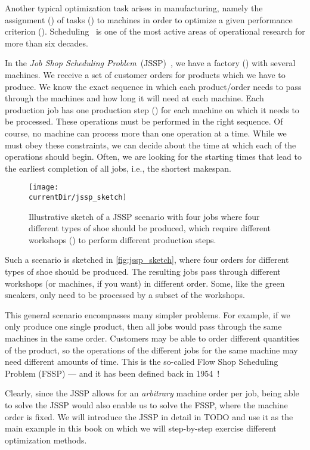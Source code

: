 %
%
\label{sec:jsspExample}%
%
Another typical optimization task arises in manufacturing, namely the assignment () of tasks () to machines in order to optimize a given performance criterion ().
Scheduling~\cite{P2016STAAS,PS2009FYOSASOM} is one of the most active areas of operational research for more than  six decades.

In the \emph{Job Shop Scheduling Problem}~(JSSP)~\cite{CGLL1995STAIA,GLLRK1979OAAIDSASAS,LLRKS1993SASAAC,L1982RRITTOMS,T1993BFBSP,BDP1996TJSSPCANST}, we have a factory () with several machines.
We receive a set of customer orders for products which we have to produce.
We know the exact sequence in which each product/order needs to pass through the machines and how long it will need at each machine.
Each production job has one production step () for each machine on which it needs to be processed.
These operations must be performed in the right sequence.
Of course, no machine can process more than one operation at a time.
While we must obey these constraints, we can decide about the time at which each of the operations should begin.
Often, we are looking for the starting times that lead to the earliest completion of all jobs, i.e., the shortest makespan.

\begin{figure}%
\centering%
\texttt{[image: \\currentDir/jssp\_sketch]}%
\caption{Illustrative sketch of a JSSP scenario with four jobs where four different types of shoe should be produced, which require different workshops () to perform different production steps.}%
\label{fig:jssp_sketch}%
\end{figure}%
%
Such a scenario is sketched in \autoref{fig:jssp_sketch}, where four orders for different types of shoe should be produced.
The resulting jobs pass through different workshops (or machines, if you want) in different order.
Some, like the green sneakers, only need to be processed by a subset of the workshops.

This general scenario encompasses many simpler problems.
For example, if we only produce one single product, then all jobs would pass through the same machines in the same order.
Customers may be able to order different quantities of the product, so the operations of the different jobs for the same machine may need different amounts of time.
This is the so-called Flow Shop Scheduling Problem (FSSP) --- and it has been defined back in 1954~\cite{J1954OTATSPSWSTI}!

Clearly, since the JSSP allows for an \emph{arbitrary} machine order per job, being able to solve the JSSP would also enable us to solve the FSSP, where the machine order is fixed.
We will introduce the JSSP in detail in TODO and use it as the main example in this book on which we will step-by-step exercise different optimization methods.%
\endhsection%
%
